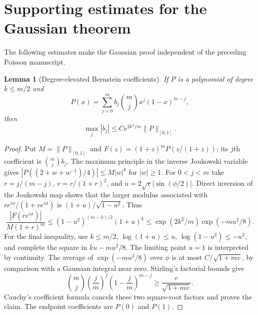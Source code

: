 \documentclass[11pt,a4paper]{article}
\newtheorem{lemma}[theorem]{Lemma}
\theoremstyle{definition}
\theoremstyle{remark}
\numberwithin{equation}{section}
\newcommand{\collectedappendix}{%
 \setcounter{section}{0}%
 \renewcommand{\thesection}{\Roman{part}.\Alph{section}}%
 \renewcommand{\theHsection}{p\arabic{part}.a\arabic{section}}%
}
\begin{document}
\clearpage
\collectedappendix

\section{Supporting estimates for the Gaussian theorem}
\label{p5:gg:supporting}

The following estimates make the Gaussian proof independent of
the preceding Poisson manuscript.

\begin{lemma}[Degree-elevated Bernstein coefficients]\label{p5:gg:bernstein}
If $P$ is a polynomial of degree $k\le m/2$ and
\[
 P(x)=\sum_{j=0}^m b_j\binom mj x^j(1-x)^{m-j},
\]
then
\[
                  \max_j|b_j|\le Ce^{2k^2/m}\|P\|_{[0,1]}.
\]
\end{lemma}
\begin{proof}
Put $M=\|P\|_{[0,1]}$ and
$F(z)=(1+z)^mP(z/(1+z))$; its $j$th coefficient is
$\binom mj b_j$.  The maximum principle in the inverse Joukowski
variable gives
$|P((2+w+w^{-1})/4)|\le M|w|^k$ for $|w|\ge1$.
For $0<j<m$ take $r=j/(m-j)$, $v=r/(1+r)^2$, and
$u=2\sqrt v|\sin(\phi/2)|$.  Direct inversion of the Joukowski
map shows that the larger modulus associated with
$re^{i\phi}/(1+re^{i\phi})$ is
$(1+u)/\sqrt{1-u^2}$.  Thus
\[
 \frac{|F(re^{i\phi})|}{M(1+r)^m}
 \le(1-u^2)^{(m-k)/2}(1+u)^k
 \le\exp(2k^2/m)\exp(-mu^2/8).
\]
For the final inequality, use $k\le m/2$, $\log(1+u)\le u$,
$\log(1-u^2)\le-u^2$, and complete the square in
$ku-mu^2/8$.  The limiting point $u=1$ is interpreted by continuity.
The average of $\exp(-mu^2/8)$ over $\phi$ is at most
$C/\sqrt{1+mv}$, by comparison with a Gaussian integral near zero.
Stirling's factorial bounds give
\[
 \binom mj\left(\frac jm\right)^j
          \left(1-\frac jm\right)^{m-j}
                         \ge\frac c{\sqrt{1+mv}}.
\]
Cauchy's coefficient formula cancels these two square-root factors
and proves the claim.  The endpoint coefficients are $P(0)$ and
$P(1)$.
\end{proof}
\end{document}
